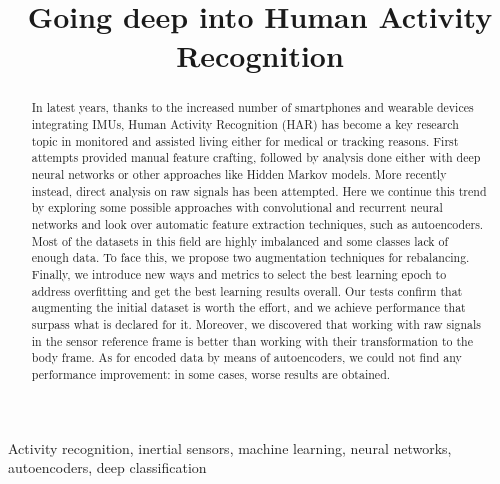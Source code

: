 \documentclass[journal,10pt,twoside]{IEEEtran}
\title{Going deep into Human Activity Recognition}
\author{%
    \IEEEauthorblockN{Elia Bonetto and Filippo Rigotto}

    \IEEEauthorblockA{Department of Information Engineering, University of Padova -- Via Gradenigo, 6/b, 35131 Padova, Italy\\ %
        {\tt\{eliabntt94,rigotto.filippo\}@gmail.com}}
}
\begin{document}
\maketitle

\begin{abstract}
In latest years, thanks to the increased number of smartphones and wearable devices integrating IMUs, Human Activity Recognition (HAR) has become a key research topic in monitored and assisted living either for medical or tracking reasons.
First attempts provided manual feature crafting, followed by analysis done either with deep neural networks or other approaches like Hidden Markov models.
More recently instead, direct analysis on raw signals has been attempted.
Here we continue this trend by exploring some possible approaches with convolutional and recurrent neural networks and look over automatic feature extraction techniques, such as autoencoders.
Most of the datasets in this field are highly imbalanced and some classes lack of enough data.
To face this, we propose two augmentation techniques for rebalancing.
Finally, we introduce new ways and metrics to select the best learning epoch to address overfitting and get the best learning results overall.
Our tests confirm that augmenting the initial dataset is worth the effort, and we achieve performance that surpass what is declared for it.
Moreover, we discovered that working with raw signals in the sensor reference frame is better than working with their transformation to the body frame.
As for encoded data by means of autoencoders, we could not find any performance improvement: in some cases, worse results are obtained.
\end{abstract}

\begin{IEEEkeywords}
Activity recognition, inertial sensors, machine learning, neural networks, autoencoders, deep classification
\end{IEEEkeywords}









\end{document}
